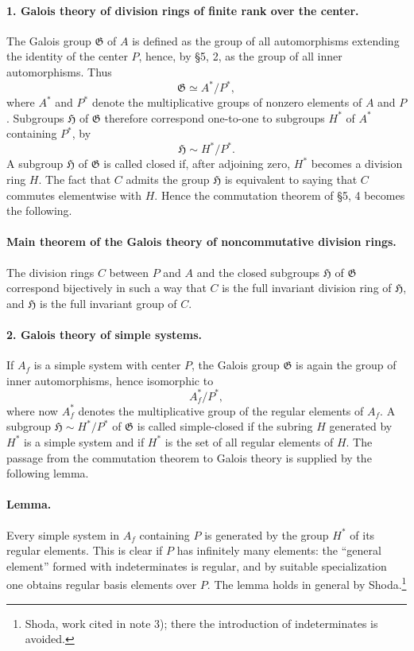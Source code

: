 \documentclass[11pt]{article}
\providecommand{\Gcal}{\mathfrak G}
\begin{document}
\paragraph{1. Galois theory of division rings of finite rank over the center.}
The Galois group \(\Gcal\) of \(A\) is defined as the group of all automorphisms extending the identity of the center \(P\), hence, by §5, 2, as the group of all inner automorphisms. Thus
\[
        \Gcal \simeq A^*/P^*,
\]
where \(A^*\) and \(P^*\) denote the multiplicative groups of nonzero elements of \(A\) and \(P\). Subgroups \(\mathfrak H\) of \(\Gcal\) therefore correspond one-to-one to subgroups \(H^*\) of \(A^*\) containing \(P^*\), by
\[
        \mathfrak H\sim H^*/P^* .
\]
A subgroup \(\mathfrak H\) of \(\Gcal\) is called closed if, after adjoining zero, \(H^*\) becomes a division ring \(H\). The fact that \(C\) admits the group \(\mathfrak H\) is equivalent to saying that \(C\) commutes elementwise with \(H\). Hence the commutation theorem of §5, 4 becomes the following.

\paragraph{Main theorem of the Galois theory of noncommutative division rings.}
The division rings \(C\) between \(P\) and \(A\) and the closed subgroups \(\mathfrak H\) of \(\Gcal\) correspond bijectively in such a way that \(C\) is the full invariant division ring of \(\mathfrak H\), and \(\mathfrak H\) is the full invariant group of \(C\).

\paragraph{2. Galois theory of simple systems.}
If \(A_f\) is a simple system with center \(P\), the Galois group \(\Gcal\) is again the group of inner automorphisms, hence isomorphic to
\[
        A_f^*/P^*,
\]
where now \(A_f^*\) denotes the multiplicative group of the regular elements of \(A_f\). A subgroup \(\mathfrak H\sim H^*/P^*\) of \(\Gcal\) is called simple-closed if the subring \(H\) generated by \(H^*\) is a simple system and if \(H^*\) is the set of all regular elements of \(H\). The passage from the commutation theorem to Galois theory is supplied by the following lemma.

\paragraph{Lemma.}
Every simple system in \(A_f\) containing \(P\) is generated by the group \(H^*\) of its regular elements. This is clear if \(P\) has infinitely many elements: the “general element” formed with indeterminates is regular, and by suitable specialization one obtains regular basis elements over \(P\). The lemma holds in general by Shoda.\footnote{Shoda, work cited in note 3); there the introduction of indeterminates is avoided.}
\end{document}
